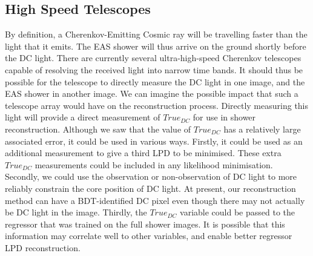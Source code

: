 \documentclass[11pt]{article}
\begin{document}
\subsection{High Speed Telescopes}
By definition, a Cherenkov-Emitting Cosmic ray will be travelling faster than the light that it emits. The EAS shower will thus arrive on the ground shortly before the DC light. There are currently several ultra-high-speed Cherenkov telescopes capable of resolving the received light into narrow time bands. It should thus be possible for the telescope to directly measure the DC light in one image, and the EAS shower in another image. We can imagine the possible impact that such a telescope array would have on the reconstruction process. Directly measuring this light will provide a direct measurement of $True_{DC}$ for use in shower reconstruction. Although we saw that the value of $True_{DC}$ has a relatively large associated error, it could be used in various ways. Firstly, it could be used as an additional measurement to give a third LPD to be minimised. These extra $True_{DC}$ measurements could be included in any likelihood minimisation. Secondly, we could use the observation or non-observation of DC light to more reliably constrain the core position of DC light. At present, our reconstruction method can have a BDT-identified DC pixel even though there may not actually be DC light in the image. Thirdly, the $True_{DC}$ variable could be passed to the regressor that was trained on the full shower images. It is possible that this information may correlate well to other variables, and enable better regressor LPD reconstruction.
\end{document}

